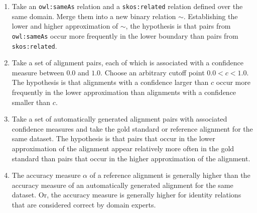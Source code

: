 \begin{enumerate}
\item Take an \verb|owl:sameAs| relation and a \verb|skos:related|
        relation defined over the same domain.
      Merge them into a new binary relation $\sim$.
      Establishing the lower and higher approximation of $\sim$,
        the hypothesis is that pairs from \verb|owl:sameAs| occur more
        frequently in the lower boundary than pairs from \verb|skos:related|.
\item Take a set of alignment pairs, each of which is associated with
        a confidence measure between $0.0$ and $1.0$.
      Choose an arbitrary cutoff point $0.0<c<1.0$.
      The hypothesis is that alignments with a confidence larger than $c$
        occur more frequently in the lower approximation than alignments
        with a confidence smaller than $c$.
\item Take a set of automatically generated alignment pairs with
        associated confidence measures and take the gold standard or
        reference alignment for the same dataset.
      The hypothesis is that pairs that occur in the lower approximation
        of the alignment appear relatively more often in the gold standard
        than pairs that occur in the higher approximation of the alignment.
\item The accuracy measure $\alpha$ of a reference alignment is generally
        higher than the accuracy measure of an automatically generated
        alignment for the same dataset.
      Or, the accuracy measure is generally higher for identity relations
        that are considered correct by domain experts.
\end{enumerate}

